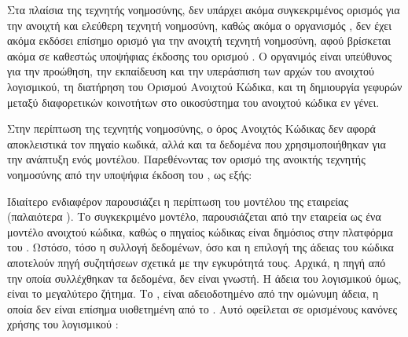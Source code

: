 Στα πλαίσια της τεχνητής νοημοσύνης, δεν υπάρχει ακόμα συγκεκριμένος
ορισμός για την ανοιχτή και ελεύθερη τεχνητή νοημοσύνη, καθώς ακόμα ο
οργανισμός , δεν έχει ακόμα εκδόσει επίσημο
ορισμό για την ανοιχτή τεχνητή νοημοσύνη, αφού βρίσκεται ακόμα σε
καθεστώς υποψήφιας
έκδοσης του ορισμού 
\cite{OpenSourceAIDefinition}. O οργανιμός 
είναι υπεύθυνος
για την προώθηση, την εκπαίδευση και την υπεράσπιση των αρχών του
ανοιχτού λογισμικού, τη διατήρηση του Ορισμού Ανοιχτού Κώδικα, και τη
δημιουργία γεφυρών μεταξύ διαφορετικών κοινοτήτων στο οικοσύστημα του
ανοιχτού κώδικα εν γένει.

Στην περίπτωση της τεχνητής νοημοσύνης, ο όρος Ανοιχτός Κώδικας δεν
αφορά αποκλειστικά τον πηγαίο κωδικά, αλλά και τα δεδομένα που
χρησιμοποιήθηκαν για την ανάπτυξη ενός μοντέλου.
Παρεθένoντας τον ορισμό της ανοικτής τεχνητής νοημοσύνης από την
υποψήφια έκδοση του , ως εξής:


Ιδιαίτερο ενδιαφέρον παρουσιάζει η περίπτωση του μοντέλου  της
εταιρείας  (παλαιότερα )\cite{llama}.
Το συγκεκριμένο μοντέλο, παρουσιάζεται από την εταιρεία  ως
ένα μοντέλο ανοιχτού κώδικα, καθώς ο πηγαίος κώδικας είναι δημόσιος
στην πλατφόρμα του .
Ωστόσο, τόσο η συλλογή δεδομένων, όσο και η επιλογή της άδειας του
κώδικα αποτελούν πηγή συζητήσεων σχετικά με την εγκυρότητά τους.
Αρχικά, η πηγή από την οποία συλλέχθηκαν τα δεδομένα, δεν είναι
γνωστή. \cite{llama3}
Η άδεια του λογισμικού όμως, είναι το μεγαλύτερο ζήτημα. Το , είναι αδειοδοτημένο από την ομώνυμη άδεια, η οποία δεν είναι
επίσημα υιοθετημένη από το . Αυτό οφείλεται
σε ορισμένους κανόνες χρήσης του λογισμικού \cite{llamalicense}:

